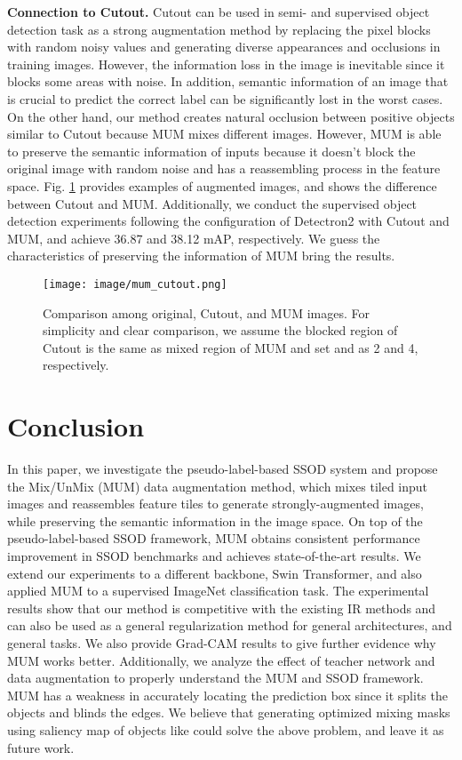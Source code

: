 \documentclass[10pt,twocolumn,letterpaper]{article}
\begin{document}
\noindent\textbf{Connection to Cutout.}
Cutout\cite{devries2017cutout} can be used in semi- and supervised object detection task \cite{bochkovskiy2020yolov4, ge2021yolox,liu2021unbiased} as a strong augmentation method by replacing the pixel blocks with random noisy values and generating diverse appearances and occlusions in training images.
However, the information loss in the image is inevitable since it blocks some areas with noise.
In addition, semantic information of an image that is crucial to predict the correct label can be significantly lost in the worst cases.
On the other hand, our method creates natural occlusion between positive objects similar to Cutout because MUM mixes different images.
However, MUM is able to preserve the semantic information of inputs because it doesn't block the original image with random noise and has a reassembling process in the feature space.
Fig. \ref{fig:cutout_tut} provides examples of augmented images, and shows the difference between Cutout and MUM.
Additionally, we conduct the supervised object detection experiments following the configuration of Detectron2\cite{wu2019detectron2} with Cutout and MUM, and achieve 36.87 and 38.12 mAP, respectively. 
We guess the characteristics of preserving the information of MUM bring the results.

\begin{figure}[t]
    \centering
    \texttt{[image: image/mum\_cutout.png]}
         \caption{Comparison among original, Cutout, and MUM images. For simplicity and clear comparison, we assume the blocked region of Cutout is the same as mixed region of MUM and set  and  as 2 and 4, respectively.}
         \label{fig:cutout_tut}
    \vspace{-5mm}
\end{figure}


\section{Conclusion}
\label{sec:conclusion}
In this paper, we investigate the pseudo-label-based SSOD system and propose the Mix/UnMix (MUM) data augmentation method, which mixes tiled input images and reassembles feature tiles to generate strongly-augmented images, while preserving the semantic information in the image space.
On top of the pseudo-label-based SSOD framework, MUM obtains consistent performance improvement in SSOD benchmarks and achieves state-of-the-art results.
We extend our experiments to a different backbone, Swin Transformer, and also applied MUM to a supervised ImageNet classification task. The experimental results show that our method is competitive with the existing IR methods  
and can also be used as a general regularization method for general architectures, and general tasks.
We also provide Grad-CAM results to give further evidence why MUM works better. 
Additionally, we analyze the effect of teacher network and data augmentation to properly understand the MUM and SSOD framework.
MUM has a weakness in accurately locating the prediction box since it splits the objects and blinds the edges.
We believe that generating optimized mixing masks using saliency map of objects like \cite{kim2020puzzle, kim2021co} could solve the above problem, and leave it as future work.
\end{document}
